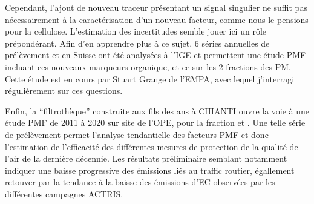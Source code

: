 Cependant, l'ajout de nouveau traceur présentant un signal singulier ne suffit pas
nécessairement à la caractérisation d'un nouveau facteur, comme nous le pensions pour la
cellulose. L'estimation des incertitudes semble jouer ici un rôle prépondérant.
Afin d'en apprendre plus à ce sujet, 6 séries annuelles de prélèvement \PMdix{} et \PMdc{}
en Suisse ont été analysées à l'IGE et permettent une étude PMF incluant ces nouveaux marqueurs
organique, et ce sur les 2 fractions des PM. Cette étude est en cours par Stuart Grange de
l'EMPA, avec lequel j'interragi régulièrement sur ces questions.


Enfin, la ``filtrothèque'' construite aux fils des ans à CHIANTI ouvre la voie à une
étude PMF de 2011 à 2020 sur site de l'OPE, pour la fraction \PMdix{} et \PMdc. Une
telle série de prélèvement permet l'analyse tendantielle des facteurs PMF et donc
l'estimation de l'efficacité des différentes mesures de protection de la qualité de l'air
de la dernière décennie. Les résultats préliminaire semblant notamment indiquer une baisse
progressive des émissions liés au traffic routier, égallement retouver par la tendance à
la baisse des émissions d'EC observées par les différentes campagnes ACTRIS.

%


